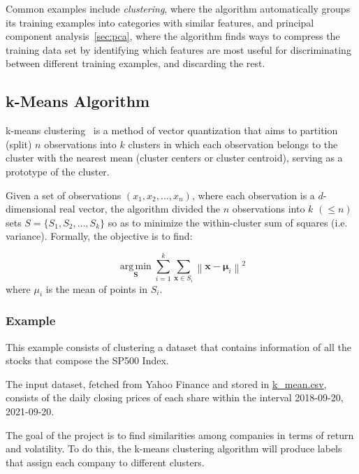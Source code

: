 Common examples include \emph{clustering}, where the algorithm automatically groups its training examples into categories with similar features, and principal component analysis~\ref{sec:pca}, where the algorithm finds ways to compress the training data set by identifying which features are most useful for discriminating between different training examples, and discarding the rest. 
    
\subsection{k-Means Algorithm}
    
k-means clustering~\cite{bib:k-means} is a method of vector quantization that aims to partition (split) $n$ observations into $k$ clusters in which each observation belongs to the cluster with the nearest mean (cluster centers or cluster centroid), serving as a prototype of the cluster. 
    
Given a set of observations $(x_1, x_2, \ldots, x_n)$, where each observation is a $d$-dimensional real vector, the algorithm divided the $n$ observations into $k$ $(\leq n)$ sets $S = \{S_1, S_2, \ldots, S_k\}$ so as to minimize the within-cluster sum of squares (i.e. variance). Formally, the objective is to find:
    
\begin{equation}
\underset {\mathbf {S}}{\operatorname {arg\,min} } \sum _{i=1}^{k}\sum _{\mathbf {x} \in S_{i}}\left\|\mathbf {x} -{\boldsymbol {\mu }}_{i}\right\|^{2}
\end{equation}
where $μ_i$ is the mean of points in $S_i$. 
    
\subsubsection{Example}
This example consists of clustering a dataset that contains information of all the stocks that compose the SP500 Index. 
    
The input dataset, fetched from Yahoo Finance and stored in \href{https://github.com/matteosan1/finance_course/raw/develop/libro/input_files/k\_mean.csv}{k\_mean.csv}, consists of the daily closing prices of each share within the interval 2018-09-20, 2021-09-20.
    
The goal of the project is to find similarities among companies in terms of return and volatility. To do this, the k-means clustering algorithm will produce labels that assign each company to different clusters.
 
